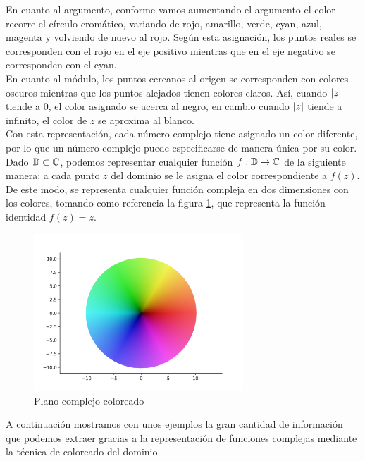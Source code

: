 En cuanto al argumento, conforme vamos aumentando el argumento el color recorre el círculo cromático, variando de rojo, amarillo, verde, cyan, azul, magenta y volviendo de nuevo al rojo. Según esta asignación, los puntos reales se corresponden con el rojo en el eje positivo mientras que en el eje negativo se corresponden con el cyan. \\

En cuanto al módulo, los puntos cercanos al origen se corresponden con colores oscuros mientras que los puntos alejados tienen colores claros. Así, cuando $\left\lvert z\right\rvert$ tiende a $0$, el color asignado se acerca al negro, en cambio cuando $\left\lvert z\right\rvert$ tiende a infinito, el color de $z$ se aproxima al blanco. \\

Con esta representación, cada número complejo tiene asignado un color diferente, por lo que un número complejo puede especificarse de manera única por su color. Dado   $\mathbb{D} \subset \mathbb{C}$, podemos representar cualquier función $f: \mathbb{D} \to \mathbb{C}$ de la siguiente manera: a cada punto $z$ del dominio se le asigna el color correspondiente a $f(z)$. De este modo, se representa cualquier función compleja en dos dimensiones con los colores, tomando como referencia la figura \ref{fig:z}, que representa la función identidad $f(z) = z$. \\

\begin{figure}[!htbp]
    \centering
    \includegraphics[width=0.7\textwidth]{../Aplicacion/z.png}
    \caption{Plano complejo coloreado}
    \label{fig:z}
\end{figure}

A continuación mostramos con unos ejemplos la gran cantidad de información que podemos extraer gracias a la representación de funciones complejas mediante la técnica de coloreado del dominio. \\

